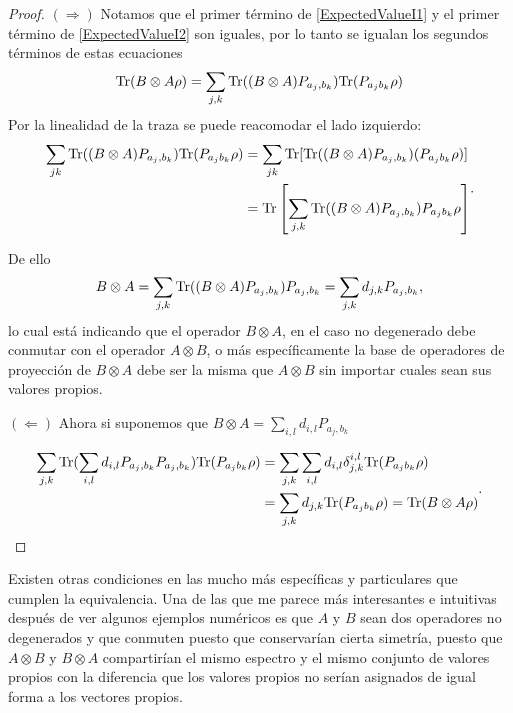 \documentclass[12pt,oneside]{book}\raggedbottom{}
\begin{document}
\begin{proof}
	$(\Rightarrow)$
Notamos que el primer término de {\ref{ExpectedValueI1}} y el primer término de {\ref{ExpectedValueI2}} son iguales, por lo tanto se igualan los segundos términos
 de estas ecuaciones \[{\rm Tr}(B\otimes A \rho)=\sum_{j,k}{\rm Tr}((B\otimes A) P_{a_j,b_k}){\rm Tr}(P_{a_j b_k}\rho )\] Por la linealidad de la traza se puede reacomodar el lado izquierdo: \[\begin{split}\sum_{jk}{\rm Tr}((B\otimes A) P_{a_j,b_k}){\rm Tr}(P_{a_j b_k}\rho )&= \sum_{jk}{\rm Tr}[{\rm Tr}((B\otimes A) P_{a_j,b_k})(P_{a_j b_k}\rho )]\\&={\rm Tr}\left[\sum_{j,k}{\rm Tr}((B\otimes A) P_{a_j,b_k})P_{a_j b_k}\rho \right]\end{split}.\]

De ello  \[B\otimes A=\sum_{j,k} {\rm Tr}((B\otimes A)P_{a_j, b_k})P_{a_j, b_k}=\sum_{j,k}d_{j,k}P_{a_j,b_k},\] lo cual está indicando que el operador \(B\otimes A\), en el caso no degenerado debe conmutar con el operador \(A\otimes B\), o más específicamente la base de operadores de proyección de $B\otimes A$ debe ser la misma que $A\otimes B$ sin importar cuales sean sus valores propios.

$(\Leftarrow)$
Ahora si suponemos que $B\otimes A=\sum_{i,l}d_{i,l}P_{a_j, b_k}$

\[\begin{split}\sum_{j,k}{\rm Tr}( \sum_{i,l}d_{i,l}P_{a_j, b_k} P_{a_j,b_k}){\rm Tr}(P_{a_j b_k}\rho )&=\sum_{j,k}\sum_{i,l}d_{i,l}\delta_{j,k}^{i,l}{\rm Tr}(P_{a_j b_k}\rho )\\&=\sum_{j,k}d_{j,k}{\rm Tr}(P_{a_j b_k}\rho )={\rm Tr}(B\otimes A\rho)\end{split}.\]


\end{proof}






Existen otras condiciones en las mucho más específicas y particulares que cumplen la equivalencia. Una de las que me parece más interesantes e intuitivas después de ver algunos ejemplos numéricos es que $A$ y $B$ sean dos operadores no degenerados y que conmuten puesto que conservarían cierta simetría, puesto que $A\otimes B$ y $B\otimes A$ compartirían el mismo espectro y el mismo conjunto de valores propios con la diferencia que los valores propios no serían asignados de igual forma a los vectores propios.
\end{document}
